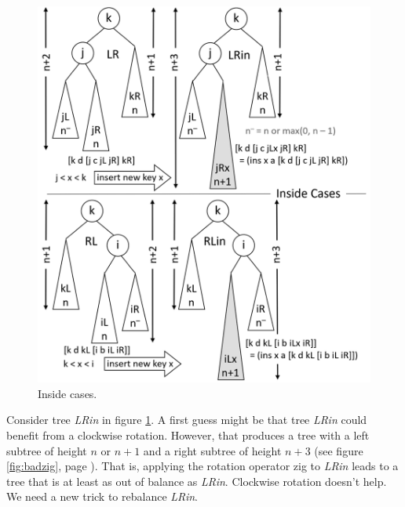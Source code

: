 \begin{figure}
\begin{center}
\includegraphics[scale=1]{images-cmyk/inside-cases}
\end{center}
\caption{Inside cases.}
\label{fig:inside-cases}
\end{figure}

Consider tree \emph{LRin} in
figure \ref{fig:inside-cases}.
A first guess might be that tree \emph{LRin}
could benefit from a clockwise rotation.
However, that produces a tree with a left subtree of height $n$ or $n+1$
and a right subtree of height $n+3$
(see figure \ref{fig:badzig}, page \pageref{fig:badzig}).
That is, applying the rotation operator \textsf{zig} to \emph{LRin}
leads to a tree that is at least as out of balance as \emph{LRin}.
Clockwise rotation doesn't help.
We need a new trick to rebalance \emph{LRin}.

